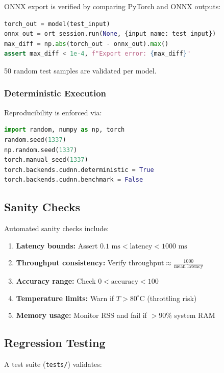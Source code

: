 \documentclass[review]{elsarticle}
\begin{document}
ONNX export is verified by comparing PyTorch and ONNX outputs:

\begin{lstlisting}[language=Python]
torch_out = model(test_input)
onnx_out = ort_session.run(None, {input_name: test_input})
max_diff = np.abs(torch_out - onnx_out).max()
assert max_diff < 1e-4, f"Export error: {max_diff}"
\end{lstlisting}

50 random test samples are validated per model.

\subsubsection{Deterministic Execution}

Reproducibility is enforced via:

\begin{lstlisting}[language=Python]
import random, numpy as np, torch
random.seed(1337)
np.random.seed(1337)
torch.manual_seed(1337)
torch.backends.cudnn.deterministic = True
torch.backends.cudnn.benchmark = False
\end{lstlisting}

\subsection{Sanity Checks}

Automated sanity checks include:

\begin{enumerate}
\item \textbf{Latency bounds:} Assert $0.1 \text{ ms} < \text{latency} < 1000 \text{ ms}$
\item \textbf{Throughput consistency:} Verify $\text{throughput} \approx \frac{1000}{\text{mean latency}}$
\item \textbf{Accuracy range:} Check $0 < \text{accuracy} < 100$
\item \textbf{Temperature limits:} Warn if $T > 80^\circ$C (throttling risk)
\item \textbf{Memory usage:} Monitor RSS and fail if $> 90\%$ system RAM
\end{enumerate}

\subsection{Regression Testing}

A test suite (\texttt{tests/}) validates:
\end{document}

